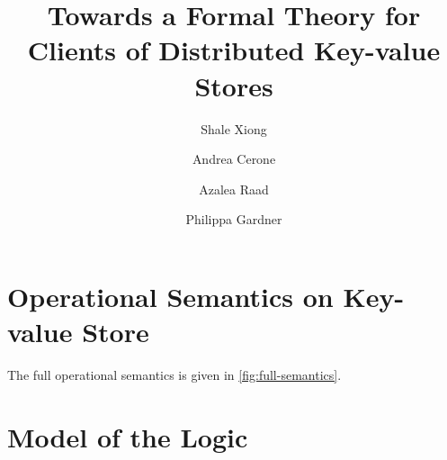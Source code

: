 \documentclass[runningheads]{llncs}
\newif\ifTechReport
\newcommand{\RootPath}{.}
\begin{document}
\title{
	Towards a Formal Theory for Clients of Distributed Key-value Stores
    } 


\author{%
Shale Xiong \and
Andrea Cerone \and
Azalea Raad \and
Philippa Gardner }
%
%


\maketitle

\begin{abstract}
    
\end{abstract}

\begin{abstract}
    
\end{abstract}





\ifTechReport




\fi

%




\newpage
\appendix
\ifTechReport
\else
\section{Operational Semantics on Key-value Store}
\label{sec:full-semantics}
The full operational semantics is given in \cref{fig:full-semantics}.





\section{Model of the Logic}
\label{sec:model-of-logic}





\fi
\end{document}
